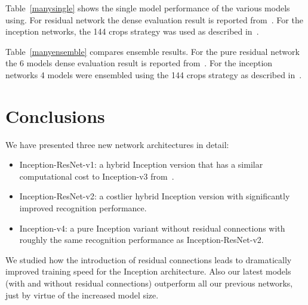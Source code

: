 \documentclass[10pt,twocolumn,letterpaper]{article}
\begin{document}
Table~\ref{manysingle} shows the single model performance of the various
models using. For residual network the dense evaluation result is reported
from~\cite{he2015deep}. For the inception networks, the 144 crops strategy
was used as described in~\cite{szegedy2015going}.

Table~\ref{manyensemble} compares ensemble results. For the pure residual
network the 6 models dense evaluation result is reported
from~\cite{he2015deep}. For the inception networks 4 models were ensembled
using the 144 crops strategy as described in~\cite{szegedy2015going}.

\section{Conclusions}

We have presented three new network architectures in detail:

\begin{itemize}
  \item Inception-ResNet-v1: a hybrid Inception version that has a
    similar computational cost to Inception-v3
    from~\cite{szegedy2015rethinking}.
  \item Inception-ResNet-v2: a costlier hybrid Inception version with
    significantly improved recognition performance.
  \item Inception-v4: a pure Inception variant without residual connections
    with roughly the same recognition performance as Inception-ResNet-v2.
\end{itemize}

We studied how the introduction of residual connections leads to dramatically
improved training speed for the Inception architecture. Also our latest models
(with and without residual connections) outperform all our previous networks,
just by virtue of the increased model size.



{\small


}
\end{document}
